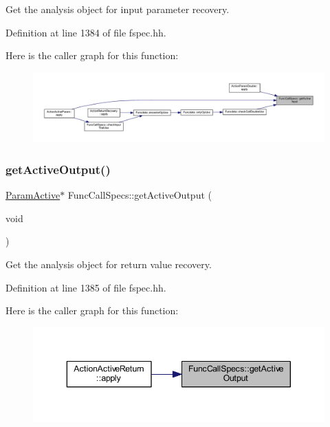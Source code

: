 Get the analysis object for input parameter recovery. 



Definition at line 1384 of file fspec.\+hh.

Here is the caller graph for this function\+:
\nopagebreak
\begin{figure}[H]
\begin{center}
\leavevmode
\includegraphics[width=350pt]{class_func_call_specs_a32432a6c7b201dc160ae0b2480a1b8b9_icgraph}
\end{center}
\end{figure}
\mbox{\label{class_func_call_specs_a866e9a9406614829224612035f28d311}} 
\subsubsection{\texorpdfstring{getActiveOutput()}{getActiveOutput()}}
{\footnotesize\ttfamily \mbox{\hyperlink{class_param_active}{Param\+Active}}$\ast$ Func\+Call\+Specs\+::get\+Active\+Output (\begin{DoxyParamCaption}\item[{void}]{ }\end{DoxyParamCaption})\hspace{0.3cm}{\ttfamily [inline]}}



Get the analysis object for return value recovery. 



Definition at line 1385 of file fspec.\+hh.

Here is the caller graph for this function\+:
\nopagebreak
\begin{figure}[H]
\begin{center}
\leavevmode
\includegraphics[width=343pt]{class_func_call_specs_a866e9a9406614829224612035f28d311_icgraph}
\end{center}
\end{figure}
\mbox{\label{class_func_call_specs_ade3352e35ffd4ed59bbc78f4b43c2998}} 
